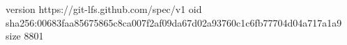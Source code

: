 version https://git-lfs.github.com/spec/v1
oid sha256:00683faa85675865c8ca007f2af09da67d02a93760c1c6fb77704d04a717a1a9
size 8801
